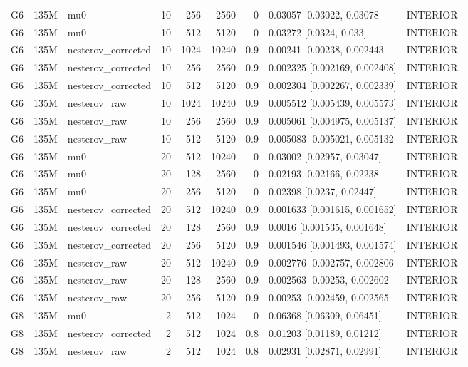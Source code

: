 \begin{longtable}{lllrrrrll}
G6 & 135M & mu0 & 10 & 256 & 2560 & 0 & 0.03057 [0.03022, 0.03078] & INTERIOR \\
G6 & 135M & mu0 & 10 & 512 & 5120 & 0 & 0.03272 [0.0324, 0.033] & INTERIOR \\
G6 & 135M & nesterov\_corrected & 10 & 1024 & 10240 & 0.9 & 0.00241 [0.00238, 0.002443] & INTERIOR \\
G6 & 135M & nesterov\_corrected & 10 & 256 & 2560 & 0.9 & 0.002325 [0.002169, 0.002408] & INTERIOR \\
G6 & 135M & nesterov\_corrected & 10 & 512 & 5120 & 0.9 & 0.002304 [0.002267, 0.002339] & INTERIOR \\
G6 & 135M & nesterov\_raw & 10 & 1024 & 10240 & 0.9 & 0.005512 [0.005439, 0.005573] & INTERIOR \\
G6 & 135M & nesterov\_raw & 10 & 256 & 2560 & 0.9 & 0.005061 [0.004975, 0.005137] & INTERIOR \\
G6 & 135M & nesterov\_raw & 10 & 512 & 5120 & 0.9 & 0.005083 [0.005021, 0.005132] & INTERIOR \\
G6 & 135M & mu0 & 20 & 512 & 10240 & 0 & 0.03002 [0.02957, 0.03047] & INTERIOR \\
G6 & 135M & mu0 & 20 & 128 & 2560 & 0 & 0.02193 [0.02166, 0.02238] & INTERIOR \\
G6 & 135M & mu0 & 20 & 256 & 5120 & 0 & 0.02398 [0.0237, 0.02447] & INTERIOR \\
G6 & 135M & nesterov\_corrected & 20 & 512 & 10240 & 0.9 & 0.001633 [0.001615, 0.001652] & INTERIOR \\
G6 & 135M & nesterov\_corrected & 20 & 128 & 2560 & 0.9 & 0.0016 [0.001535, 0.001648] & INTERIOR \\
G6 & 135M & nesterov\_corrected & 20 & 256 & 5120 & 0.9 & 0.001546 [0.001493, 0.001574] & INTERIOR \\
G6 & 135M & nesterov\_raw & 20 & 512 & 10240 & 0.9 & 0.002776 [0.002757, 0.002806] & INTERIOR \\
G6 & 135M & nesterov\_raw & 20 & 128 & 2560 & 0.9 & 0.002563 [0.00253, 0.002602] & INTERIOR \\
G6 & 135M & nesterov\_raw & 20 & 256 & 5120 & 0.9 & 0.00253 [0.002459, 0.002565] & INTERIOR \\
G8 & 135M & mu0 & 2 & 512 & 1024 & 0 & 0.06368 [0.06309, 0.06451] & INTERIOR \\
G8 & 135M & nesterov\_corrected & 2 & 512 & 1024 & 0.8 & 0.01203 [0.01189, 0.01212] & INTERIOR \\
G8 & 135M & nesterov\_raw & 2 & 512 & 1024 & 0.8 & 0.02931 [0.02871, 0.02991] & INTERIOR \\

\end{longtable}
